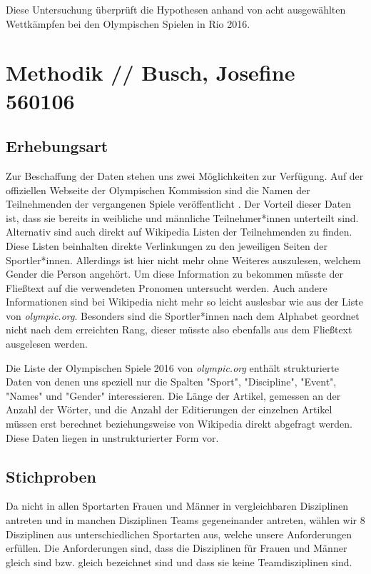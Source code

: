\documentclass[11pt]{article}
\begin{document}
Diese Untersuchung überprüft die Hypothesen anhand von acht ausgewählten Wettkämpfen bei den Olympischen Spielen in Rio 2016.

\section{Methodik // Busch, Josefine 560106}
\label{igw}

\subsection{Erhebungsart}
Zur Beschaffung der Daten stehen uns zwei Möglichkeiten zur Verfügung. Auf der offiziellen Webseite der Olympischen Kommission sind die Namen der Teilnehmenden der vergangenen Spiele veröffentlicht \parencite{olympicResults}. Der Vorteil dieser Daten ist, dass sie bereits in weibliche und männliche Teilnehmer*innen unterteilt sind. Alternativ sind auch direkt auf Wikipedia Listen der Teilnehmenden zu finden. \parencite{WikpediaOlympics2016} Diese Listen beinhalten direkte Verlinkungen zu den jeweiligen Seiten der Sportler*innen. Allerdings ist hier nicht mehr ohne Weiteres auszulesen, welchem Gender die Person angehört. Um diese Information zu bekommen müsste der Fließtext auf die verwendeten Pronomen untersucht werden. Auch andere Informationen sind bei Wikipedia nicht mehr so leicht auslesbar wie aus der Liste von \textit{olympic.org}. Besonders sind die Sportler*innen nach dem Alphabet geordnet nicht nach dem erreichten Rang, dieser müsste also ebenfalls aus dem Fließtext ausgelesen werden.

Die Liste der Olympischen Spiele 2016 von \textit{olympic.org} enthält strukturierte Daten von denen uns speziell nur die Spalten "Sport", "Discipline", "Event", "Names" und "Gender" interessieren.
Die Länge der Artikel, gemessen an der Anzahl der Wörter, und die Anzahl der Editierungen der einzelnen Artikel müssen erst berechnet beziehungsweise von Wikipedia direkt abgefragt werden. Diese Daten liegen in unstrukturierter Form vor.

\subsection{Stichproben}
Da nicht in allen Sportarten Frauen und Männer in vergleichbaren Disziplinen antreten und in manchen Disziplinen Teams gegeneinander antreten, wählen wir 8 Disziplinen aus unterschiedlichen Sportarten aus, welche unsere Anforderungen erfüllen. Die Anforderungen sind, dass die Disziplinen für Frauen und Männer gleich sind bzw. gleich bezeichnet sind und dass sie keine Teamdisziplinen sind.
\end{document}
